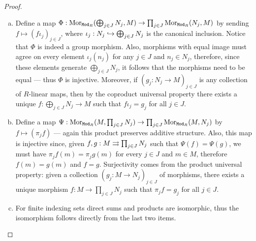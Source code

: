 \begin{proof}
    \begin{enumerate}[(a)]\setlength\itemsep{0em}
        \item Define a map
              \(\Phi: \operatorname{Mor}_{{\texttt{Mod}_{R}}}(\bigoplus_{j \in J} N_j, M) \to \prod_{j \in J}
              \operatorname{Mor}_{{\texttt{Mod}_{R}}}(N_j, M)\) by sending \(f \mapsto (f \iota_j)_{j \in J}\),
              where \(\iota_j: N_j \hookrightarrow \bigoplus_{j \in J} N_j\) is the canonical
              inclusion. Notice that \(\Phi\) is indeed a group morphism. Also, morphisms
              with equal image must agree on every element \(\iota_j(n_j)\) for any
              \(j \in J\) and \(n_j \in N_j\), therefore, since these elements generate
              \(\bigoplus_{j \in J} N_j\), it follows that the morphisms need to be equal
              --- thus \(\Phi\) is injective. Moreover, if \((g_j: N_j \to M)_{j \in J}\) is
              any collection of \(R\)-linear maps, then by the coproduct universal property
              there exists a unique \(f: \bigoplus_{j \in J} N_j \to M\) such that
              \(f \iota_j = g_j\) for all \(j \in J\).

        \item Define a map
              \(\Psi: \operatorname{Mor}_{{\texttt{Mod}_{R}}}(M, \prod_{j \in J} N_j) \to \prod_{j \in J}
              \operatorname{Mor}_{{\texttt{Mod}_{R}}}(M, N_j)\) by \(f \mapsto (\pi_j f)\) --- again
              this product preserves additive structure. Also, this map is injective since,
              given \(f, g: M \rightrightarrows \prod_{j \in J} N_j\) such that \(\Psi(f) = \Psi(g)\),
              we must have \(\pi_j f(m) = \pi_j g(m)\) for every \(j \in J\) and
              \(m \in M\), therefore \(f(m) = g(m)\) and \(f = g\). Surjectivity comes from
              the product universal property: given a collection
              \((g_j: M \to N_j)_{j \in J}\) of morphisms, there exists a unique morphism
              \(f: M \to \prod_{j \in J} N_j\) such that \(\pi_j f = g_j\) for all
              \(j \in J\).

        \item For finite indexing sets direct sums and products are isomorphic, thus the
              isomorphism follows directly from the last two items.
    \end{enumerate}
\end{proof}

